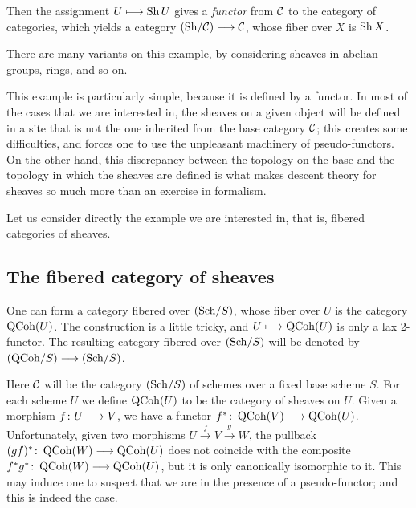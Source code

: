 \begin{3   FIBERED CATEGORIES}
\begin{3.2 Examples of fibered categories}
\begin{example}
\begin{shaded}
Then the assignment $U\longmapsto \operatorname{Sh}{U}$ gives a \emph{functor} from $\mathcal{C}$ to the category of categories, which yields a category $\catsh{\cC} \arr \cC$, whose fiber over $X$ is $\operatorname{Sh}{X}$.
\end{shaded}

\end{example}

There are many variants on this example, by considering sheaves in abelian groups, rings, and so on.

This example is particularly simple, because it is defined by a functor. In most of the cases that we are interested in, the sheaves on a given object will be defined in a site that is not the one inherited from the base category $\mathcal{C}$; this creates some difficulties, and forces one to use the unpleasant machinery of pseudo-functors. On the other hand, this discrepancy between the topology on the base and the topology in which the sheaves are defined is what makes descent theory for \qc sheaves so much more than an exercise in formalism.

Let us consider directly the example we are interested in, that is, fibered categories of \qc sheaves.

\subsection{The fibered category of \qc sheaves}
\label{subsec:fibered-quasi-coherent}
\hfil
\begin{shaded}
One can form a category fibered over $({\mathrm{Sch}/S})$, whose fiber over $U$ is the category $\operatorname{QCoh}(U)$. The construction is a little tricky, and $U\longmapsto \operatorname{QCoh}(U)$ is only a lax 2-functor. The resulting category  fibered over $({\mathrm{Sch}/S})$ will be denoted by $\catqc{S} \arr \catsch{S}$.
\end{shaded}


Here $\mathcal{C}$ will be the category $({\mathrm{Sch}/S})$ of schemes over a fixed base scheme $S$. For each scheme $U$ we define $\operatorname{QCoh}(U)$ to be the category of \qc sheaves on $U$. Given a morphism $f \colon U \arr V$, we have a functor $f^* \colon \qcoh V \arr \qcoh U$. Unfortunately, given two morphisms $U \xrightarrow{f} V \xrightarrow{g} W$, the pullback $(gf)^* \colon \qcoh W \arr \qcoh U$ does not coincide with the composite $f^*g^* \colon \qcoh W \arr \qcoh U$, but it is only  canonically isomorphic to it. This may induce one to suspect that we are in the presence of a pseudo-functor; and this is indeed the case.


\end{3.2 Examples of fibered categories}
\end{3   FIBERED CATEGORIES}
